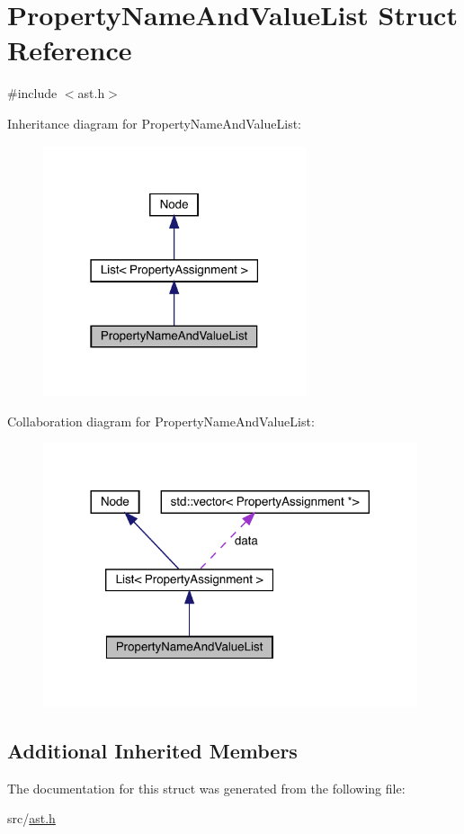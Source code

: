\hypertarget{struct_property_name_and_value_list}{}\section{Property\+Name\+And\+Value\+List Struct Reference}
\label{struct_property_name_and_value_list}


{\ttfamily \#include $<$ast.\+h$>$}



Inheritance diagram for Property\+Name\+And\+Value\+List\+:\nopagebreak
\begin{figure}[H]
\begin{center}
\leavevmode
\includegraphics[width=219pt]{struct_property_name_and_value_list__inherit__graph}
\end{center}
\end{figure}


Collaboration diagram for Property\+Name\+And\+Value\+List\+:\nopagebreak
\begin{figure}[H]
\begin{center}
\leavevmode
\includegraphics[width=312pt]{struct_property_name_and_value_list__coll__graph}
\end{center}
\end{figure}
\subsection*{Additional Inherited Members}


The documentation for this struct was generated from the following file\+:\begin{DoxyCompactItemize}
\item 
src/\hyperlink{ast_8h}{ast.\+h}\end{DoxyCompactItemize}
